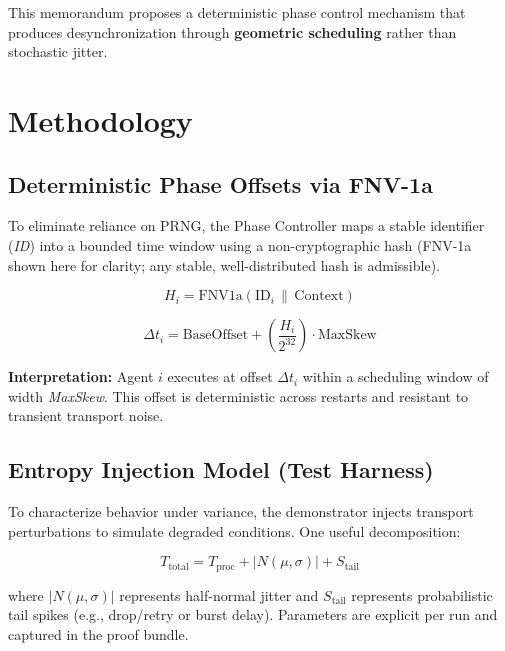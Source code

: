 \documentclass[10pt,twocolumn,letterpaper]{article}
\begin{document}
This memorandum proposes a deterministic phase control mechanism that produces desynchronization through \textbf{geometric scheduling} rather than stochastic jitter.

\section{Methodology}

\subsection{Deterministic Phase Offsets via FNV-1a}
To eliminate reliance on PRNG, the Phase Controller maps a stable identifier (\textit{ID}) into a bounded time window using a non-cryptographic hash (FNV-1a shown here for clarity; any stable, well-distributed hash is admissible).

\begin{equation}
H_i = \mathrm{FNV1a}(\mathrm{ID}_i \,\|\, \mathrm{Context})
\end{equation}

\begin{equation}
\Delta t_i = \mathrm{BaseOffset} + \left( \frac{H_i}{2^{32}} \right)\cdot \mathrm{MaxSkew}
\end{equation}

\noindent \textbf{Interpretation:} Agent $i$ executes at offset $\Delta t_i$ within a scheduling window of width \textit{MaxSkew}. This offset is deterministic across restarts and resistant to transient transport noise.

\subsection{Entropy Injection Model (Test Harness)}
To characterize behavior under variance, the demonstrator injects transport perturbations to simulate degraded conditions. One useful decomposition:

\begin{equation}
T_{\mathrm{total}} = T_{\mathrm{proc}} + |N(\mu,\sigma)| + S_{\mathrm{tail}}
\end{equation}

\noindent where $|N(\mu,\sigma)|$ represents half-normal jitter and $S_{\mathrm{tail}}$ represents probabilistic tail spikes (e.g., drop/retry or burst delay). Parameters are explicit per run and captured in the proof bundle.

\end{document}
